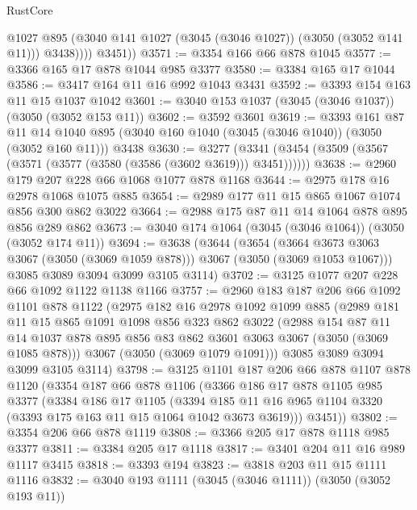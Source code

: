 \begin{lexlean}{RustCore}
\begin{coremodule}
                @1027
                @895
                (@3040 @141 @1027 (@3045 (@3046 @1027)) (@3050 (@3052 @141 @11)))
                @3438))))
        @3451))
@3571 := @3354 @166 @66 @878 @1045
@3577 := @3366 @165 @17 @878 @1044 @985 @3377
@3580 := @3384 @165 @17 @1044
@3586 := @3417 @164 @11 @16 @992 @1043 @3431
@3592 := @3393 @154 @163 @11 @15 @1037 @1042
@3601 := @3040 @153 @1037 (@3045 (@3046 @1037)) (@3050 (@3052 @153 @11))
@3602 := @3592 @3601
@3619 := @3393
    @161
    @87
    @11
    @14
    @1040
    @895
    (@3040 @160 @1040 (@3045 (@3046 @1040)) (@3050 (@3052 @160 @11)))
    @3438
@3630 := @3277 (@3341 (@3454 (@3509 (@3567 (@3571 (@3577 (@3580 (@3586 (@3602 @3619))) @3451))))))
@3638 := @2960 @179 @207 @228 @66 @1068 @1077 @878 @1168
@3644 := @2975 @178 @16 @2978 @1068 @1075 @885
@3654 := @2989 @177 @11 @15 @865 @1067 @1074 @856 @300 @862 @3022
@3664 := @2988 @175 @87 @11 @14 @1064 @878 @895 @856 @289 @862
@3673 := @3040 @174 @1064 (@3045 (@3046 @1064)) (@3050 (@3052 @174 @11))
@3694 := @3638
    (@3644
      (@3654 (@3664 @3673 @3063 @3067 (@3050 (@3069 @1059 @878))) @3067 (@3050 (@3069 @1053 @1067)))
      @3085
      @3089
      @3094
      @3099
      @3105
      @3114)
@3702 := @3125 @1077 @207 @228 @66 @1092 @1122 @1138 @1166
@3757 := @2960
    @183
    @187
    @206
    @66
    @1092
    @1101
    @878
    @1122
    (@2975
      @182
      @16
      @2978
      @1092
      @1099
      @885
      (@2989
        @181
        @11
        @15
        @865
        @1091
        @1098
        @856
        @323
        @862
        @3022
        (@2988
          @154
          @87
          @11
          @14
          @1037
          @878
          @895
          @856
          @83
          @862
          @3601
          @3063
          @3067
          (@3050 (@3069 @1085 @878)))
        @3067
        (@3050 (@3069 @1079 @1091)))
      @3085
      @3089
      @3094
      @3099
      @3105
      @3114)
@3798 := @3125
    @1101
    @187
    @206
    @66
    @878
    @1107
    @878
    @1120
    (@3354
      @187
      @66
      @878
      @1106
      (@3366
        @186
        @17
        @878
        @1105
        @985
        @3377
        (@3384
          @186
          @17
          @1105
          (@3394 @185 @11 @16 @965 @1104 @3320 (@3393 @175 @163 @11 @15 @1064 @1042 @3673 @3619)))
        @3451))
@3802 := @3354 @206 @66 @878 @1119
@3808 := @3366 @205 @17 @878 @1118 @985 @3377
@3811 := @3384 @205 @17 @1118
@3817 := @3401 @204 @11 @16 @989 @1117 @3415
@3818 := @3393 @194
@3823 := @3818 @203 @11 @15 @1111 @1116
@3832 := @3040 @193 @1111 (@3045 (@3046 @1111)) (@3050 (@3052 @193 @11))

\end{coremodule}
\end{lexlean}

